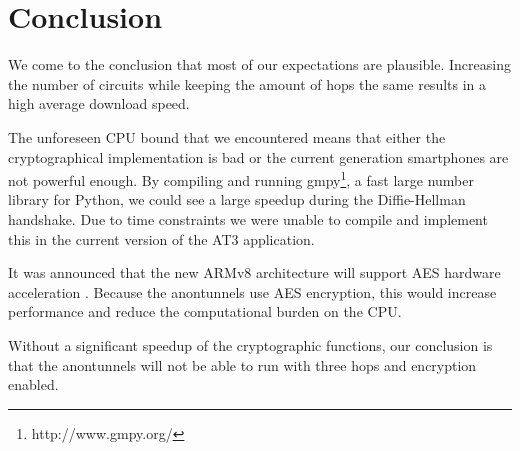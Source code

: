\section{Conclusion}
\label{sec:experiments:conclusion}
	We come to the conclusion that most of our expectations are plausible. Increasing the number of circuits while keeping the amount of hops the same results in a high average download speed. %
	
	The unforeseen CPU bound that we encountered means that either the cryptographical implementation is bad or the current generation smartphones are not powerful enough. By compiling and running gmpy\footnote{http://www.gmpy.org/}, a fast large number library for Python, we could see a large speedup during the Diffie-Hellman handshake. Due to time constraints we were unable to compile and implement this in the current version of the AT3 application.
	
	It was announced that the new ARMv8 architecture will support AES hardware acceleration \cite{armv8anouncement}. Because the anontunnels use AES encryption, this would increase performance and reduce the computational burden on the CPU. %
	
	Without a significant speedup of the cryptographic functions, our conclusion is that the anontunnels will not be able to run with three hops and encryption enabled.